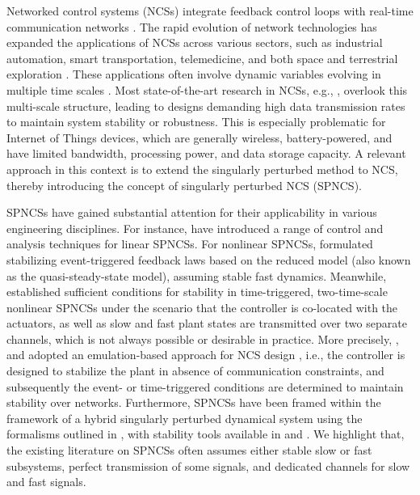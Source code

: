 Networked control systems (NCSs) integrate feedback control loops with real-time communication networks \cite{definition}. The rapid evolution of network technologies has expanded the applications of NCSs across various sectors, such as industrial automation, smart transportation, telemedicine, and both space and terrestrial exploration \cite{xu2018survey}. These applications often involve dynamic variables evolving in multiple time scales \cite{kokotovic_singular_book}. 
%
Most state-of-the-art research in NCSs, e.g., \cite{dragan_stability,carnevale_stability,heijmans2017computing}, overlook this multi-scale structure, leading to designs demanding high data transmission rates to maintain system stability or robustness. This is especially problematic for Internet of Things devices, which are generally wireless, battery-powered, and have limited bandwidth, processing power, and data storage capacity.
%
A relevant approach in this context is to extend the singularly perturbed method \cite{nonlinear_systems_Khalil} to NCS, thereby introducing the concept of singularly perturbed NCS (SPNCS).



SPNCSs have gained substantial attention for their applicability in various engineering disciplines. 
For instance, \cite{wang2021observer,song2019dynamic,lei2022event} have introduced a range of control and analysis techniques for linear SPNCSs. 
%
For nonlinear SPNCSs, \cite{Romain_ETC} formulated stabilizing event-triggered feedback laws based on the reduced model (also known as the quasi-steady-state model), assuming stable fast dynamics. 
%
Meanwhile, \cite{SPNCS} established sufficient conditions for stability in time-triggered, two-time-scale nonlinear SPNCSs under the scenario that the controller is co-located with the actuators, as well as slow and fast plant states are transmitted over two separate channels, which is not always possible or desirable in practice.
%
More precisely, \cite{lei2022event}, \cite{Romain_ETC} and \cite{SPNCS} adopted an emulation-based approach for NCS design \cite{dragan_stability}, i.e., the controller is designed to stabilize the plant in absence of communication constraints, and subsequently the event- or time-triggered conditions are determined to maintain stability over networks.
%
Furthermore, SPNCSs have been framed within the framework of a hybrid singularly perturbed dynamical system using the formalisms outlined in \cite{gosate12}, with stability tools available in \cite{sanfelice2011singular} and \cite{wang2012analysis}.
%
We highlight that, the existing literature on SPNCSs often assumes either stable slow or fast subsystems, perfect transmission of some signals, and dedicated channels for slow and fast signals.





